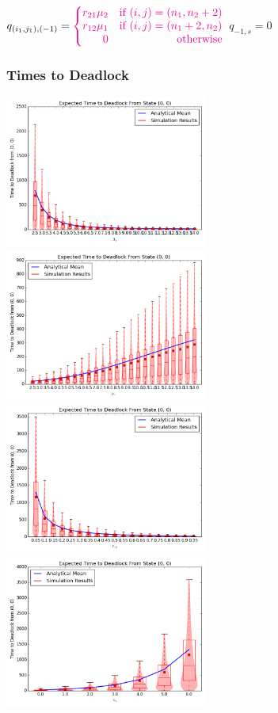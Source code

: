 \documentclass{beamer}
\begin{document}
\begin{frame}
$q_{(i_1, j_1), (-1)} = \color{magenta} \left\{
  \begin{matrix*}[ r ]
    r_{21}\mu_2 & \text{if } (i, j) = (n_1, n_2 + 2) \\
    r_{12}\mu_1 & \text{if } (i, j) = (n_1 + 2, n_2) \\
    0 & \text{otherwise}
  \end{matrix*}
  \right.$\newline\newline
$q_{-1, s} = 0$
\end{frame}

\begin{frame}
    \begin{figure}
    
    \end{figure}
\end{frame}

\begin{frame}
    \frametitle{Times to Deadlock}
    \includegraphics[width=0.5\textwidth]{varyL1}
    \includegraphics[width=0.5\textwidth]{varymu1}\newline
    \includegraphics[width=0.5\textwidth]{varyr12}
    \includegraphics[width=0.5\textwidth]{varyn1}
\end{frame}
\end{document}
